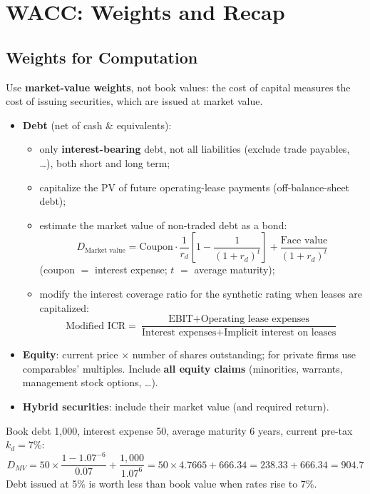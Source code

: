 \section{WACC: Weights and Recap}

\subsection{Weights for Computation}
\begin{keybox}
Use \textbf{market-value weights}, not book values: the cost of capital measures the cost of issuing securities, which are issued at market value.
\end{keybox}
\begin{itemize}
  \item \textbf{Debt} (net of cash \& equivalents):
  \begin{itemize}
    \item only \textbf{interest-bearing} debt, not all liabilities (exclude trade payables, \dots), both short and long term;
    \item capitalize the PV of future operating-lease payments (off-balance-sheet debt);
    \item estimate the market value of non-traded debt as a bond:
    \[
    D_{\text{Market value}}=\text{Coupon}\cdot\frac{1}{r_d}\left[1-\frac{1}{(1+r_d)^t}\right]+\frac{\text{Face value}}{(1+r_d)^t}
    \]
    (coupon $=$ interest expense; $t$ $=$ average maturity);
    \item modify the interest coverage ratio for the synthetic rating when leases are capitalized:
    \[
    \text{Modified ICR}=\frac{\text{EBIT}+\text{Operating lease expenses}}{\text{Interest expenses}+\text{Implicit interest on leases}}
    \]
  \end{itemize}
  \item \textbf{Equity}: current price $\times$ number of shares outstanding; for private firms use comparables' multiples. Include \textbf{all equity claims} (minorities, warrants, management stock options, \dots).
  \item \textbf{Hybrid securities}: include their market value (and required return).
\end{itemize}
\begin{exbox}
Book debt 1,000, interest expense 50, average maturity 6 years, current pre-tax $k_d=7\%$:
\[
D_{MV}=50\times\frac{1-1.07^{-6}}{0.07}+\frac{1{,}000}{1.07^{6}}=50\times4.7665+666.34=238.33+666.34=\mathbf{904.7}
\]
Debt issued at 5\% is worth less than book value when rates rise to 7\%.
\end{exbox}

